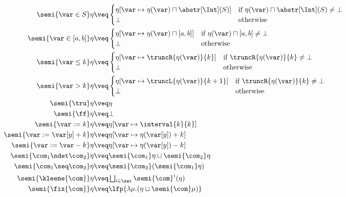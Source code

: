 \begin{align*}
  \semi{\var \in S}\eta 
  & \veq  
    \begin{cases}
      \eta[\var \mapsto \eta(\var)\sqcap \abstr[\Int](S)] & \text{if
                                                            }\eta(\var)\sqcap \abstr[\Int](S)\neq \bot \\ \bot &
                                                                                                                 \text{otherwise}
    \end{cases}\\
  \semi{\var \in [a,b]}\eta 
  & \veq
    \begin{cases}
      \eta[\var \mapsto \eta(\var)\sqcap [a,b]]  & \text{if }\eta(\var)\sqcap [a,b]\neq \bot \\
      \bot & \text{otherwise}
    \end{cases}\\
  \semi{\var \leq k}\eta 
  & \veq 
    \begin{cases}
      \eta[\var \mapsto \truncR{\eta(\var)}{k}] & \text{if }\truncR{\eta(\var)}{k}\neq \bot \\
      \bot & \text{otherwise}
    \end{cases}\\
  \semi{\var > k}\eta 
  & \veq 
    \begin{cases}
      \eta[\var \mapsto \truncL{\eta(\var)}{k+1}] & \text{if }\truncR{\eta(\var)}{k}\neq \bot \\
      \bot & \text{otherwise}
    \end{cases}\\
  \semi{\tru}\eta 
  & \veq \eta\\
  \semi{\ff}\eta 
  & \veq \bot\\
  \semi{\var := k}\eta 
  & \veq \eta[\var \mapsto \interval{k}{k}]\\
  \semi{\var := \var[y] + k}\eta 
  & \veq \eta[\var \mapsto \eta (\var[y]) + k]\\
  \semi{\var := \var - k}\eta 
  & \veq \eta[\var \mapsto \eta (\var[y]) - k]\\
  \semi{\com_1 \ndet \com_2} \eta
  & \veq \semi{\com_1} \eta \sqcup \semi{\com_2} \eta\\
  \semi{\com_1 \seq \com_2} \eta
  & \veq \semi{\com_2} (\semi{\com_1} \eta)\\
  \semi{\kleene{\com}} \eta
  & \veq \textstyle \bigsqcup_{i \in \nat} \semi{\com}^i (\eta)\\
  \semi{\fix{\com}} \eta
  & \veq  \lfp{\lambda \mu. (\eta \sqcup \semi{\com} \mu)}
\end{align*}

